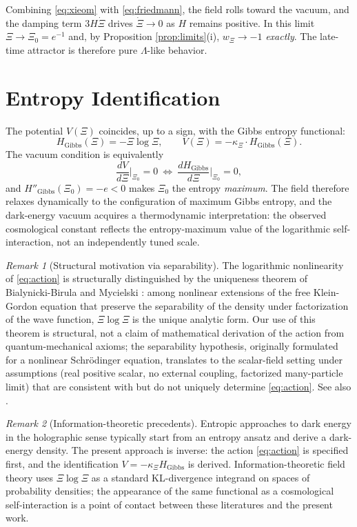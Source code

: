 \documentclass[11pt,reqno]{amsart}
\theoremstyle{plain}
\theoremstyle{definition}
\theoremstyle{remark}
\newtheorem*{remark}{Remark}
\newcommand{\Gibbs}{\mathrm{Gibbs}}
\begin{document}
Combining \eqref{eq:xieom} with \eqref{eq:friedmann}, the field rolls toward
the vacuum, and the damping term $3H\dot\Xi$ drives $\dot\Xi\to 0$ as $H$
remains positive. In this limit $\Xi\to\Xi_0=e^{-1}$ and, by Proposition
\ref{prop:limits}(i), $w_\Xi\to-1$ \emph{exactly}. The late-time attractor is
therefore pure $\Lambda$-like behavior.

\section{Entropy Identification}\label{sec:entropy}

The potential $V(\Xi)$ coincides, up to a sign, with the Gibbs entropy
functional:
\begin{equation}\label{eq:entropy}
  H_{\Gibbs}(\Xi)=-\Xi\log\Xi,\qquad V(\Xi)=-\kappa_\Xi\cdot H_{\Gibbs}(\Xi).
\end{equation}
The vacuum condition is equivalently
\[
  \frac{dV}{d\Xi}\bigg|_{\Xi_0}=0\ \Longleftrightarrow\ \frac{dH_{\Gibbs}}{d\Xi}\bigg|_{\Xi_0}=0,
\]
and $H''_{\Gibbs}(\Xi_0)=-e<0$ makes $\Xi_0$ the entropy \emph{maximum}. The
field therefore relaxes dynamically to the configuration of maximum Gibbs
entropy, and the dark-energy vacuum acquires a thermodynamic interpretation:
the observed cosmological constant reflects the entropy-maximum value of the
logarithmic self-interaction, not an independently tuned scale.

\begin{remark}[Structural motivation via separability]
The logarithmic nonlinearity of \eqref{eq:action} is structurally distinguished
by the uniqueness theorem of Bialynicki-Birula and Mycielski
\cite{BialynickiBirulaMycielski1976}: among nonlinear extensions of the free
Klein-Gordon equation that preserve the separability of the density under
factorization of the wave function, $\Xi\log\Xi$ is the unique analytic form.
Our use of this theorem is structural, not a claim of mathematical derivation
of the action from quantum-mechanical axioms; the separability hypothesis,
originally formulated for a nonlinear Schr\"odinger equation, translates to
the scalar-field setting under assumptions (real positive scalar, no external
coupling, factorized many-particle limit) that are consistent with but do not
uniquely determine \eqref{eq:action}. See also \cite{Rosen1969,CazenaveHaraux1980,HoeghKrohn1971}.
\end{remark}

\begin{remark}[Information-theoretic precedents]
Entropic approaches to dark energy in the holographic sense
\cite{CHLZ2012,Verlinde2011} typically start from an entropy ansatz and derive
a dark-energy density. The present approach is inverse: the action
\eqref{eq:action} is specified first, and the identification
$V=-\kappa_\Xi H_{\Gibbs}$ is derived. Information-theoretic field theory
\cite{Ensslin2013,Caticha2012} uses $\Xi\log\Xi$ as a standard KL-divergence
integrand on spaces of probability densities; the appearance of the same
functional as a cosmological self-interaction is a point of contact between
these literatures and the present work.
\end{remark}
\end{document}
